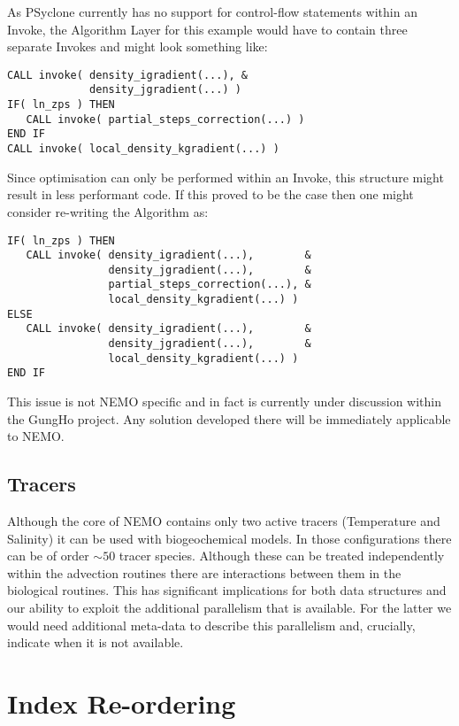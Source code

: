 \documentclass{article}
\begin{document}
As PSyclone currently has no support for control-flow statements
within an Invoke, the Algorithm Layer for this example would have to
contain three separate Invokes and might look something like:

\begin{verbatim}
CALL invoke( density_igradient(...), &
             density_jgradient(...) )
IF( ln_zps ) THEN
   CALL invoke( partial_steps_correction(...) )
END IF
CALL invoke( local_density_kgradient(...) )
\end{verbatim}

Since optimisation can only be performed within an Invoke, this
structure might result in less performant code. If this proved to be
the case then one might consider re-writing the Algorithm as:

\begin{verbatim}
IF( ln_zps ) THEN
   CALL invoke( density_igradient(...),        &
                density_jgradient(...),        &
                partial_steps_correction(...), &
                local_density_kgradient(...) )
ELSE
   CALL invoke( density_igradient(...),        &
                density_jgradient(...),        &
                local_density_kgradient(...) )
END IF
\end{verbatim}

This issue is not NEMO specific and in fact is currently under
discussion within the GungHo project. Any solution developed there
will be immediately applicable to NEMO.

\subsection{Tracers}

Although the core of NEMO contains only two active tracers
(Temperature and Salinity) it can be used with biogeochemical
models. In those configurations there can be of order $\sim 50$ tracer
species. Although these can be treated independently within the
advection routines there are interactions between them in the
biological routines. This has significant implications for both data
structures and our ability to exploit the additional parallelism that
is available. For the latter we would need additional meta-data to
describe this parallelism and, crucially, indicate when it is not
available.

\section{Index Re-ordering}
\end{document}

